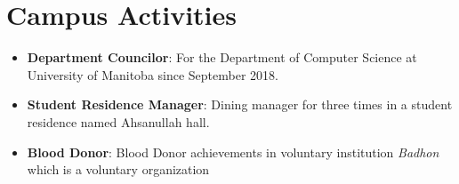 \documentclass[letterpaper,11pt]{article}
\newcommand{\resumeItem}[2]{
  \item\small{
    \textbf{#1}{: #2 \vspace{-2pt}}
  }
}
\newcommand{\resumeSubItem}[2]{\resumeItem{#1}{#2}\vspace{-4pt}}
\newcommand{\resumeSubHeadingListStart}{\begin{itemize}[leftmargin=*]}
\newcommand{\resumeSubHeadingListEnd}{\end{itemize}}
\begin{document}

\section{Campus Activities}
    \resumeSubHeadingListStart
        \resumeSubItem
            {Department Councilor}
            {For the Department of Computer Science at University of Manitoba since September 2018.}
        \resumeSubItem
            {Student Residence Manager}
            {Dining manager for three times in a student residence named Ahsanullah hall.}
        \resumeSubItem
            {Blood Donor}
            {Blood Donor achievements in voluntary institution \textit{Badhon} which is a voluntary organization}
    \resumeSubHeadingListEnd

\begin{comment}
\section{Languages}
    \resumeSubHeadingListStart
        \resumeSubItem{Bangla}{Native Language}
        \resumeSubItem{English}{Fluent (speaking, reading, writing)}
    \resumeSubHeadingListEnd

\section{Interests}
    \small{Trekking, Sports, Violin. }
\end{comment}
    
\end{document}
